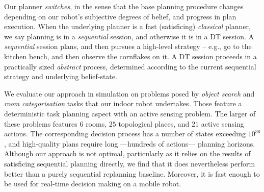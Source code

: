 Our planner {\em switches}, in the sense that the base planning
procedure changes depending on our robot's subjective degrees of
belief, and progress in plan execution. When the underlying planner is
a fast (satisficing) {\em classical} planner, we say planning is in a
{\em sequential} session, and otherwise it is in a DT session.
A {\em sequential} session plans, and then pursues a high-level
strategy -- e.g., go to the kitchen bench, and then observe the
cornflakes on it.
A DT session proceeds in a practically sized {\em abstract} process,
determined according to the current sequential strategy and underlying
belief-state.


We evaluate our approach in simulation on problems posed by {\em
object search} and {\em room categorisation} tasks that our indoor
robot undertakes. Those feature a deterministic task planning aspect
with an active sensing problem. The larger of these problems features
$6$ rooms, $25$ topological places, and $21$ active sensing
actions. The corresponding decision process has a number of states
exceeding $10^{36}$, and high-quality plans require long ---hundreds
of actions--- planning horizons.
Although our approach is not optimal, particularly as it relies on the
results of satisficing sequential planning directly, we find that it
does nevertheless perform better than a purely sequential replanning
baseline. Moreover, it is fast enough to be used for real-time
decision making on a mobile robot.
